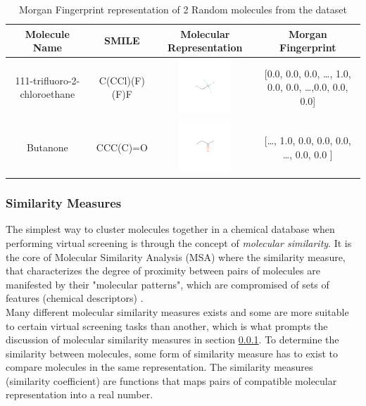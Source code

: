 \documentclass[a4paper,12pt]{report}
\begin{document}
					\begin{table}[ht!]
						\centering
						\caption{Morgan Fingerprint representation of 2 Random molecules from the dataset}
						\begin{tabular}{ | c | c | c | c |   }
							\hline
							Molecule Name & SMILE & Molecular Representation & Morgan Fingerprint \\
							\hline
							111-trifluoro-2-chloroethane & C(CCl)(F)(F)F & \includegraphics[width=2cm,height=2cm]{images/111-trifluoro-2-chloroethane.png} & [0.0, 0.0, 0.0, \ldots, 1.0, 0.0, 0.0, \ldots ,0.0, 0.0, 0.0] \\
							\hline
							Butanone & CCC(C)=O & \includegraphics[width=2cm,height=2cm]{images/Butanone.png} & [\ldots, 1.0, 0.0, 0.0, 0.0, \ldots, 0.0, 0.0 ] \\
							\hline
						\end{tabular}
						\label{table:random_morgan_fingerprint}
					\end{table} 
			\subsubsection{Similarity Measures} 
			\label{subsubsection_similarity_measures}
			The simplest way to cluster molecules together in a chemical database when performing virtual screening is through the concept of \textit{molecular similarity}. It is the core of Molecular Similarity Analysis (MSA) where the similarity measure, that characterizes the degree of proximity between pairs of molecules are manifested by their "molecular patterns", which are compromised of sets of features (chemical descriptors) \cite{Jurgen2004}. \\
			Many different molecular similarity measures exists and some are more suitable to certain virtual screening tasks than another, which is what prompts the discussion of molecular similarity measures in section \ref{subsubsection_similarity_measures}. 
			To determine the similarity between molecules, some form of similarity measure has to exist to compare molecules in the same representation. The similarity measures (similarity coefficient) are functions that maps pairs of compatible molecular representation into a real number. 
			
\end{document}
